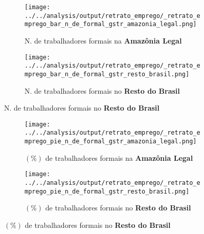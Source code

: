 \documentclass[11pt]{beamer}
\begin{document}
\begin{frame}[label=_retrato_emprego_bar_n_de_formal_gstr]{}
\textit{\hyperlink{indice_principal}{}}
\begin{figure}
\centering
\begin{subfigure}{.5\textwidth}
  \centering
  \texttt{[image: ../../analysis/output/retrato\_emprego/\_retrato\_emprego\_bar\_n\_de\_formal\_gstr\_amazonia\_legal.png]}
  \label{fig:_retrato_emprego_bar_n_de_formal_gstr_amazonia_legal}
  \caption{{\tiny N. de trabalhadores formais na \textbf{Amazônia Legal}}}
\end{subfigure}%
\begin{subfigure}{.5\textwidth}
  \centering
  \texttt{[image: ../../analysis/output/retrato\_emprego/\_retrato\_emprego\_bar\_n\_de\_formal\_gstr\_resto\_brasil.png]}
  \label{fig:_retrato_emprego_bar_n_de_formal_gstr_resto_brasil}
   \caption{{\tiny N. de trabalhadores formais no \textbf{Resto do Brasil}}}
\end{subfigure}
\end{figure}
\end{frame}

\begin{frame}[label=_retrato_emprego_pie_n_de_formal_gstr]{}
\textit{\hyperlink{indice_principal}{}}
\begin{figure}
\centering
\begin{subfigure}{.5\textwidth}
  \centering
  \texttt{[image: ../../analysis/output/retrato\_emprego/\_retrato\_emprego\_pie\_n\_de\_formal\_gstr\_amazonia\_legal.png]}
  \label{fig:_retrato_emprego_pie_n_de_formal_gstr_amazonia_legal}
  \caption{{\tiny $(\%)$ de trabalhadores formais na \textbf{Amazônia Legal}}}
\end{subfigure}%
\begin{subfigure}{.5\textwidth}
  \centering
  \texttt{[image: ../../analysis/output/retrato\_emprego/\_retrato\_emprego\_pie\_n\_de\_formal\_gstr\_resto\_brasil.png]}
  \label{fig:_retrato_emprego_pie_n_de_formal_gstr_resto_brasil}
   \caption{{\tiny $(\%)$ de trabalhadores formais no \textbf{Resto do Brasil}}}
\end{subfigure}
\end{figure}
\end{frame}
\end{document}
